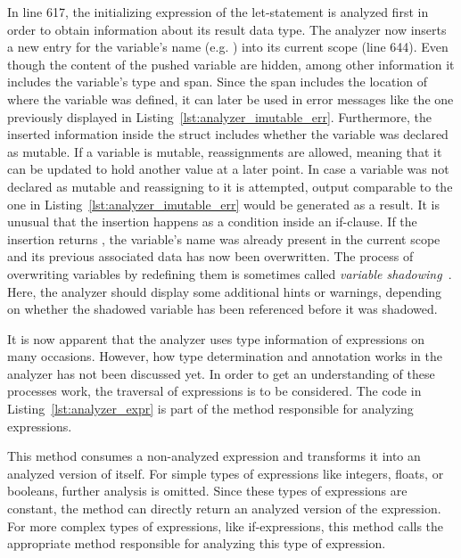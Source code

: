 In line 617, the initializing expression of the let-statement is analyzed first in order to obtain information about its result data type.
The analyzer now inserts a new entry for the variable's name (e.g. ) into its current scope (line 644).
Even though the content of the pushed variable are hidden, among other information it includes the variable's type and span.
Since the span includes the location of where the variable was defined, it can later be used in error messages like the one previously displayed in Listing~\ref{lst:analyzer_imutable_err}.
Furthermore, the inserted information inside the struct includes whether the variable was declared as mutable.
If a variable is mutable, reassignments are allowed, meaning that it can be updated to hold another value at a later point.
In case a variable was not declared as mutable and reassigning to it is attempted,
output comparable to the one in Listing~\ref{lst:analyzer_imutable_err} would be generated as a result.
It is unusual that the insertion happens as a condition inside an if-clause.
If the insertion returns , the variable's name was already present in the current scope and its previous associated data has now been overwritten.
The process of overwriting variables by redefining them is sometimes called \emph{variable shadowing}~\cite[p.~34]{Klabnik2019}.
Here, the analyzer should display some additional hints or warnings, depending on whether the shadowed variable has been referenced before it was shadowed.

It is now apparent that the analyzer uses type information of expressions on many occasions.
However, how type determination and annotation works in the analyzer has not been discussed yet.
In order to get an understanding of these processes work, the traversal of expressions is to be considered.
The code in Listing~\ref{lst:analyzer_expr} is part of the method responsible for analyzing expressions.


This method consumes a non-analyzed expression and transforms it into an analyzed version of itself.
For simple types of expressions like integers, floats, or booleans, further analysis is omitted.
Since these types of expressions are constant, the method can directly return an analyzed version of the expression.
For more complex types of expressions, like if-expressions, this method calls the appropriate method responsible for analyzing this type of expression.

